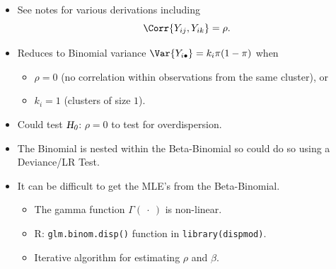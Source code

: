 \documentclass[oneside]{book}\usepackage[]{graphicx}\usepackage[svgnames]{xcolor}
\newcommand{\HN}{\textsl{H}_{\textsl{0}}}%
\begin{document}
\begin{enumerate}[1.]
\begin{itemize}
              \item See notes for various derivations including
                    \[ \Corr{Y_{ij},Y_{ik}}=\rho. \]
              \item Reduces to Binomial variance $ \Var{Y_{i\bullet}}=k_i\pi(1-\pi) $ when
                    \begin{itemize}
                        \item $ \rho=0 $ (no correlation within observations from the same cluster), or
                        \item $ k_i=1 $ (clusters of size $ 1 $).
                    \end{itemize}
              \item Could test $ \HN $: $ \rho=0 $ to test for overdispersion.
              \item The Binomial is nested within the Beta-Binomial so could do so using a
                    Deviance/LR Test.
              \item It can be difficult to get the MLE's from the Beta-Binomial.
                    \begin{itemize}
                        \item The gamma function $ \Gamma(\:\cdot\:) $ is non-linear.
                        \item R: \texttt{glm.binom.disp()} function in \texttt{library(dispmod)}.
                        \item Iterative algorithm for estimating $ \rho $ and $ \beta $.
                    \end{itemize}
          \end{itemize}
\end{enumerate}
\end{document}
